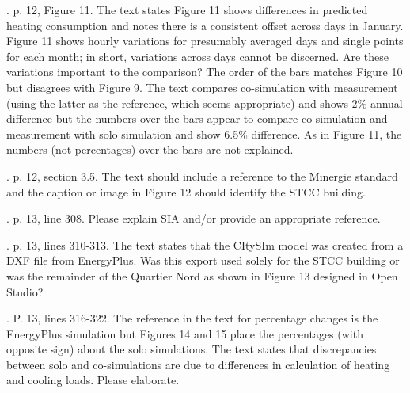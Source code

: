 \documentclass[answers,12pt]{exam}
\begin{document}
\begin{questions}
. p. 12, Figure 11.  The text states Figure 11 shows differences in predicted heating consumption and notes there is a consistent offset across days in January.  Figure 11 shows hourly variations for presumably averaged days and single points for each month; in short, variations across days cannot be discerned.  Are these variations important to the comparison?  The order of the bars matches Figure 10 but disagrees with Figure 9.  The text compares co-simulation with measurement (using the latter as the reference, which seems appropriate) and shows 2\% annual difference but the numbers over the bars appear to compare co-simulation and measurement with solo simulation and show 6.5\% difference.  As in Figure 11, the numbers (not percentages) over the bars are not explained. 
\begin{solution}
\end{solution}

. p. 12, section 3.5.  The text should include a reference to the Minergie standard and the caption or image in Figure 12 should identify the STCC building. 
\begin{solution}
\end{solution}

. p. 13, line 308.  Please explain SIA and/or provide an appropriate reference.   
\begin{solution}
\end{solution}

. p. 13, lines 310-313.  The text states that the CItySIm model was created from a DXF file from EnergyPlus.  Was this export used solely for the STCC building or was the remainder of the Quartier Nord as shown in Figure 13 designed in Open Studio? 
\begin{solution}
\end{solution}

. P. 13, lines 316-322.  The reference in the text for percentage changes is the EnergyPlus simulation but Figures 14 and 15 place the percentages (with opposite sign) about the solo simulations.  The text states that discrepancies between solo and co-simulations are due to differences in calculation of heating and cooling loads.  Please elaborate. 
\begin{solution}
\end{solution}


\end{questions}
\end{document}
